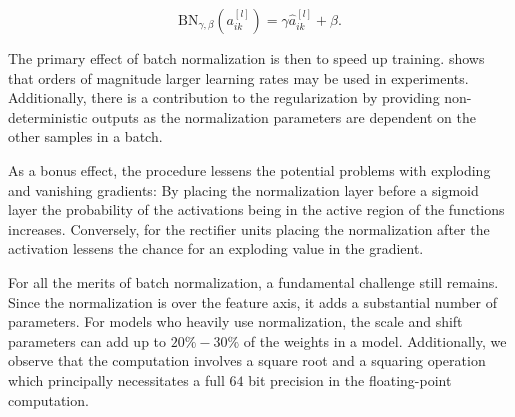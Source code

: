 \begin{equation}\label{eq:bn}
\text{BN}_{\gamma, \beta}(a_{ik}^{[l]}) = \gamma  \hat{a}_{ik}^{[l]} + \beta.
\end{equation} 

\noindent The primary effect of batch normalization is then to speed up training. \citet{Ioffe2015} shows that orders of magnitude larger learning rates may be used in experiments. Additionally, there is a contribution to the regularization by providing non-deterministic outputs as the normalization parameters are dependent on the other samples in a batch. 

As a bonus effect, the procedure lessens the potential problems with exploding and vanishing gradients: By placing the normalization layer before a sigmoid layer the probability of the activations being in the active region of the functions increases. Conversely, for the rectifier units placing the normalization after the activation lessens the chance for an exploding value in the gradient.

For all the merits of batch normalization, a fundamental challenge still remains. Since the normalization is over the feature axis, it adds a substantial number of parameters. For models who heavily use normalization, the scale and shift parameters can add up to $20\%-30\%$ of the weights in a model. Additionally, we observe that the computation involves a square root and a squaring operation which principally necessitates a full $64$ bit precision in the floating-point computation. 